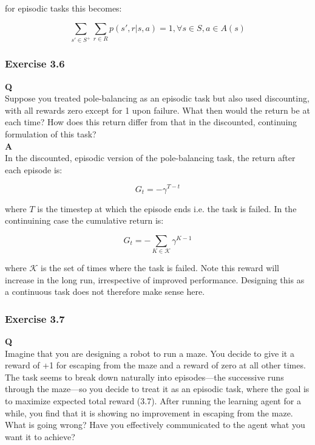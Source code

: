 for episodic tasks this becomes:

\begin{equation}
\sum_{s' \in S^+} \sum_{r \in R} p(s', r | s, a) = 1, \forall s \in S, a \in A(s)
\end{equation}

\subsubsection{Exercise 3.6}
\textbf{Q}\\
Suppose you treated pole-balancing as an episodic task but also used discounting, with all rewards zero except for 1 upon failure. What then would the return be at each time? How does this return differ from that in the discounted, continuing formulation of this task? \\

\textbf{A}\\
In the discounted, episodic version of the pole-balancing task, the return after each episode is:

\begin{equation}
	G_t = -\gamma^{T-t}
\end{equation}

where \(T\) is the timestep at which the episode ends i.e. the task is failed. In the continuining case the cumulative return is:

\begin{equation}
G_t = -\sum_{K\in\mathcal{K}} \gamma^{K-1}
\end{equation}

where \(\mathcal{K}\) is the set of times where the task is failed. Note this reward will increase in the long run, irrespective of improved performance. Designing this as a continuous task does not therefore make sense here.

\subsubsection{Exercise 3.7}
\textbf{Q}\\
Imagine that you are designing a robot to run a maze. You decide to give it a reward of +1 for escaping from the maze and a reward of zero at all other times. The task seems to break down naturally into episodes—the successive runs through the maze—so you decide to treat it as an episodic task, where the goal is to maximize expected total reward (3.7). After running the learning agent for a while, you find that it is showing no improvement in escaping from the maze. What is going  wrong? Have you effectively communicated to the agent what you want it to achieve?\\

